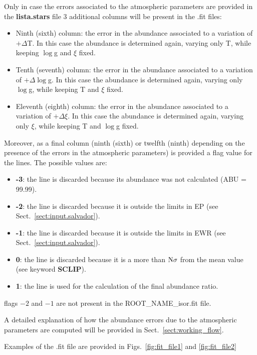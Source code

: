 \documentclass[modern]{aastex701}
\begin{document}
Only in case the errors associated to the atmospheric parameters are provided in the \textbf{lista.stars} file 3 additional columns will be present in the .fit files:
\begin{itemize}
    \item Ninth (sixth) column: the error in the abundance associated to a variation of $+\Delta$T. In this case the abundance is determined again, varying only T, while keeping $\log$g and $\xi$ fixed.
    \item Tenth (seventh) column: the error in the abundance associated to a variation of $+\Delta \log$g. In this case the abundance is determined again, varying only $\log$g, while keeping T and $\xi$ fixed.
    \item Eleventh (eighth) column: the error in the abundance associated to a variation of $+\Delta \xi$. In this case the abundance is determined again, varying only $\xi$, while keeping T and $\log$g fixed.
\end{itemize}

Moreover, as a final column (ninth (sixth) or twelfth (ninth) depending on the presence of the errors in the atmospheric parameters) is provided a flag value for the lines. The possible values are:
\begin{itemize}
    \item {\bf -3}: the line is discarded because its abundance was not calculated (ABU = 99.99). 
    \item {\bf -2}: the line is discarded because it is outside the limits in EP (see Sect.~\ref{sect:input.salvador}).
    \item {\bf -1}: the line is discarded because it is outside the limits in EWR (see Sect.~\ref{sect:input.salvador}).
    \item {\bf 0}: the line is discarded because it is a more than $\rm N\sigma$ from the mean value (see keyword {\bf SCLIP}).
    \item {\bf 1}: the line is used for the calculation of the final abundance ratio.   
\end{itemize}

flags $-2$ and $-1$ are not present in the ROOT\_NAME\_isor.fit file. 

A detailed explanation of how the abundance errors due to the atmospheric parameters are computed will be provided in Sect.~\ref{sect:working_flow}. 

Examples of the .fit file are provided in Figs.~\ref{fig:fit_file1} and \ref{fig:fit_file2}
\end{document}
